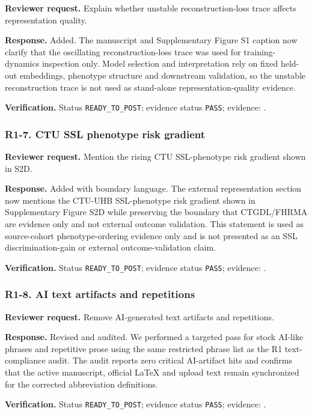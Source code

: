 \documentclass[11pt]{article}
\begin{document}
\textbf{Reviewer request.} Explain whether unstable reconstruction-loss trace affects representation quality.


\textbf{Response.} Added. The manuscript and Supplementary Figure S1 caption now clarify that the oscillating reconstruction-loss trace was used for training-dynamics inspection only. Model selection and interpretation rely on fixed held-out embeddings, phenotype structure and downstream validation, so the unstable reconstruction trace is not used as stand-alone representation-quality evidence.


\textbf{Verification.} Status \texttt{READY\_TO\_POST}; evidence status \texttt{PASS}; evidence: .


\subsubsection*{R1-7. CTU SSL phenotype risk gradient}

\textbf{Reviewer request.} Mention the rising CTU SSL-phenotype risk gradient shown in S2D.


\textbf{Response.} Added with boundary language. The external representation section now mentions the CTU-UHB SSL-phenotype risk gradient shown in Supplementary Figure S2D while preserving the boundary that CTGDL/FHRMA are  evidence only and not external outcome validation. This statement is used as source-cohort phenotype-ordering evidence only and is not presented as an SSL discrimination-gain or external outcome-validation claim.


\textbf{Verification.} Status \texttt{READY\_TO\_POST}; evidence status \texttt{PASS}; evidence: .


\subsubsection*{R1-8. AI text artifacts and repetitions}

\textbf{Reviewer request.} Remove AI-generated text artifacts and repetitions.


\textbf{Response.} Revised and audited. We performed a targeted pass for stock AI-like phrases and repetitive prose using the same restricted phrase list as the R1 text-compliance audit. The audit reports zero critical AI-artifact hits and confirms that the active manuscript, official LaTeX and upload text remain synchronized for the corrected abbreviation definitions.


\textbf{Verification.} Status \texttt{READY\_TO\_POST}; evidence status \texttt{PASS}; evidence: .
\end{document}

